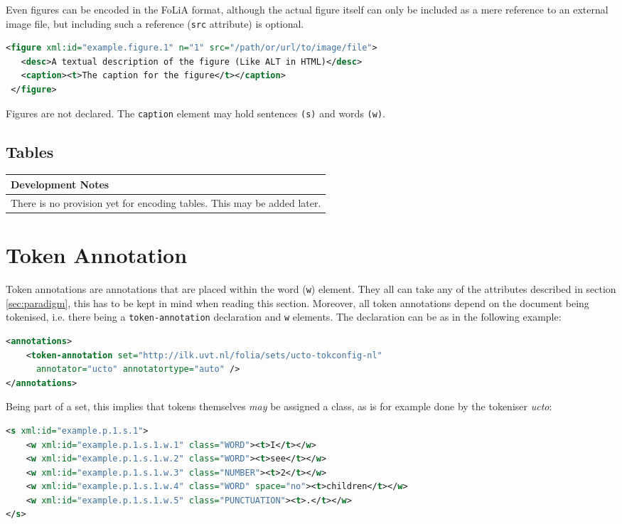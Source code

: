 \documentclass[a4paper,12pt]{report}
\newenvironment{devnotes}
{
\begin{center}
    \begin{tabular}[h!]{|p{0.8\textwidth}|}
    \hline
    {\bf Development Notes}\\\hline}
{   \\\hline
    \end{tabular}
\end{center}}
\begin{document}
Even figures can be encoded in the FoLiA format, although the actual figure itself can only be included as a mere reference to an external image file, but including such a reference (\texttt{src} attribute) is optional.

\begin{lstlisting}[language=xml]
 <figure xml:id="example.figure.1" n="1" src="/path/or/url/to/image/file">
   <desc>A textual description of the figure (Like ALT in HTML)</desc>
   <caption><t>The caption for the figure</t></caption>
 </figure>
\end{lstlisting}

Figures are not declared. The \texttt{caption} element may hold sentences \texttt{(s)} and words \texttt{(w)}.

\subsection{Tables}

\begin{devnotes}
There is no provision yet for encoding tables. This may be added later.
\end{devnotes}

\section{Token Annotation}

Token annotations are annotations that are placed within the word (\texttt{w}) element. They all can take any of the attributes described in section \ref{sec:paradigm}, this has to be kept in mind when reading this section. Moreover, all token annotations depend on the document being tokenised, i.e. there being a \texttt{token-annotation} declaration and \texttt{w} elements. The declaration can be as in the following example:

\begin{lstlisting}[language=xml]
<annotations>
    <token-annotation set="http://ilk.uvt.nl/folia/sets/ucto-tokconfig-nl"
      annotator="ucto" annotatortype="auto" />
</annotations>
\end{lstlisting}

Being part of a set, this implies that tokens themselves \emph{may} be assigned a class, as is for example done by the tokeniser \emph{ucto}:

\begin{lstlisting}[language=xml]
<s xml:id="example.p.1.s.1">
    <w xml:id="example.p.1.s.1.w.1" class="WORD"><t>I</t></w>
    <w xml:id="example.p.1.s.1.w.2" class="WORD"><t>see</t></w>
    <w xml:id="example.p.1.s.1.w.3" class="NUMBER"><t>2</t></w>
    <w xml:id="example.p.1.s.1.w.4" class="WORD" space="no"><t>children</t></w>
    <w xml:id="example.p.1.s.1.w.5" class="PUNCTUATION"><t>.</t></w>
</s>
\end{lstlisting}        
\end{document}

